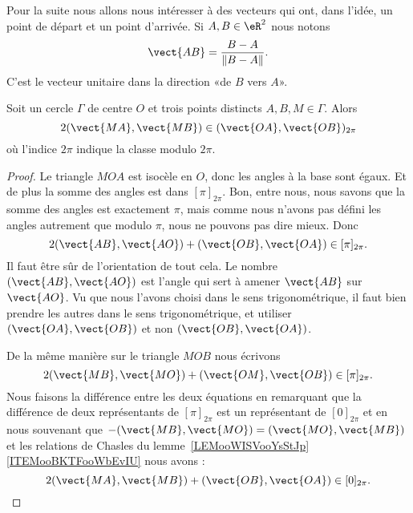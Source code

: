 Pour la suite nous allons nous intéresser à des vecteurs qui ont, dans l'idée, un point de départ et un point d'arrivée. Si \( A,B\in \eR^2\) nous notons
\begin{equation}
	\vect{ AB }=\frac{ B-A }{ \| B-A \| }.
\end{equation}
C'est le vecteur unitaire dans la direction «de \( B\) vers \( A\)».

\begin{theorem}       \label{THOooQDNKooTlVmmj}
	Soit un cercle \( \Gamma\) de centre \( O\) et trois points distincts \( A,B,M\in \Gamma\). Alors
	\begin{equation}
		2(\vect{ MA },\vect{ MB })\in (\vect{ OA },\vect{ OB })_{2\pi}
	\end{equation}
	où l'indice \( 2\pi\) indique la classe modulo \( 2\pi\).
\end{theorem}

\begin{proof}
	Le triangle \( MOA\) est isocèle en \( O\), donc les angles à la base sont égaux. Et de plus la somme des angles est dans \( [\pi]_{2\pi}\). Bon, entre nous, nous savons que la somme des angles est exactement \( \pi\), mais comme nous n'avons pas défini les angles autrement que modulo \( \pi\), nous ne pouvons pas dire mieux. Donc
	\begin{equation}
		2(\vect{ AB },\vect{ AO })+(\vect{ OB },\vect{ OA })\in [\pi]_{2\pi}.
	\end{equation}
	Il faut être sûr de l'orientation de tout cela. Le nombre \( (\vect{ AB },\vect{ AO })\) est l'angle qui sert à amener \( \vect{ AB }\) sur \( \vect{ AO }\). Vu que nous l'avons choisi dans le sens trigonométrique, il faut bien prendre les autres dans le sens trigonométrique, et utiliser \( (\vect{ OA }, \vect{ OB })\) et non \( (\vect{ OB },\vect{ OA })\).

	\begin{center}
		
	\end{center}

	De la même manière sur le triangle \( MOB\) nous écrivons
	\begin{equation}
		2(\vect{ MB },\vect{ MO })+(\vect{ OM },\vect{ OB })\in[\pi]_{2\pi}.
	\end{equation}
	Nous faisons la différence entre les deux équations en remarquant que la différence de deux représentants de \( [\pi]_{2\pi}\) est un représentant de \( [0]_{2\pi}\) et en nous souvenant que \( -(\vect{ MB },\vect{ MO })=(\vect{ MO },\vect{ MB })\) et les relations de Chasles du lemme~\ref{LEMooWISVooYsStJp}\ref{ITEMooBKTFooWbEvIU} nous avons :
	\begin{equation}
		2(\vect{ MA },\vect{ MB })+(\vect{ OB },\vect{ OA })\in[0]_{2\pi}.
	\end{equation}
\end{proof}

